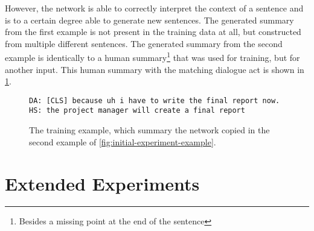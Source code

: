 However, the network is able to correctly interpret the context of a sentence and is to a certain degree able to generate new sentences.
The generated summary from the first example is not present in the training data at all, but constructed from multiple different sentences.
The generated summary from the second example is identically to a human summary\footnote{Besides a missing point at the end of the sentence} that was used for training, but for another input.
This human summary with the matching dialogue act is shown in \cref{fig:initial-experiment-training-example}.

\begin{figure}[h]
\begin{lstlisting}[numbers=none]
DA: [CLS] because uh i have to write the final report now.
HS: the project manager will create a final report 
\end{lstlisting}
\caption{The training example, which summary the network copied in the second example of \cref{fig:initial-experiment-example}.}
\label{fig:initial-experiment-training-example}
\end{figure}



\section{Extended Experiments}
